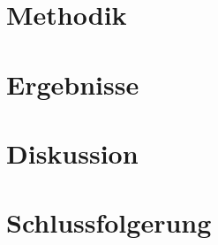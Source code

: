 \documentclass[12pt,pagesize,twoside,DIV=12,headsepline=0.4pt]{scrbook}
\begin{document}


\chapter{Methodik}
\label{ch:methodik}	%


\chapter{Ergebnisse}
\label{ch:ergebnisse}


\chapter{Diskussion}
\label{ch:diskussion}

\chapter{Schlussfolgerung}
\label{ch:schlussfolgerung}



\listoffigures   	%
\listoftables     	%



 



\end{document}
